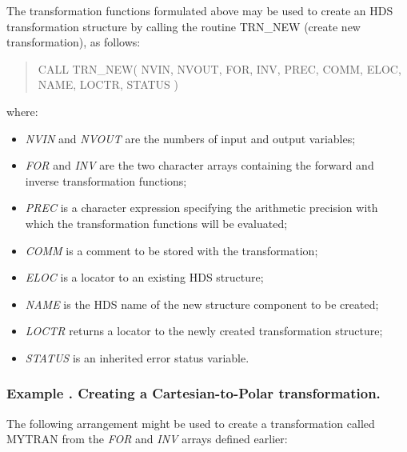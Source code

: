 \documentclass[twoside,nolof,11pt]{starlink}
\providecommand{\name}[1]{\small{#1}}
\providecommand{\fortvar}[1]{\emph{#1}}
\newcounter{examplecounter}
\providecommand{\example}[1]{\addtocounter{examplecounter}{1}
                         \subsubsection*{Example \theexamplecounter. #1}}
\begin{document}
The transformation functions formulated above may be used to create an
\name{HDS} transformation structure by calling the routine \name{TRN\_NEW}
(create new transformation), as follows:

\begin{quote}\small
\begin{terminalv}
CALL TRN_NEW( NVIN, NVOUT, FOR, INV, PREC, COMM, ELOC, NAME, LOCTR, STATUS )
\end{terminalv}
\end{quote}

where:

\begin{itemize}

\item \fortvar{NVIN} and \fortvar{NVOUT} are the numbers of input and output
variables;

\item \fortvar{FOR} and \fortvar{INV} are the two character arrays
containing the forward and inverse transformation functions;

\item \fortvar{PREC} is a character expression specifying the arithmetic
precision with which the transformation functions will be evaluated;

\item \fortvar{COMM} is a comment to be stored with the transformation;

\item \fortvar{ELOC} is a locator to an existing \name{HDS} structure;

\item \fortvar{NAME} is the \name{HDS} name of the new structure component
to be created;

\item \fortvar{LOCTR} returns a locator to the newly created transformation
structure;

\item \fortvar{STATUS} is an inherited error status variable.

\end{itemize}

\example{Creating a Cartesian-to-Polar transformation.}
The following arrangement might be used to create a transformation called
\name{MYTRAN} from the \fortvar{FOR} and \fortvar{INV} arrays defined
earlier:
\end{document}
